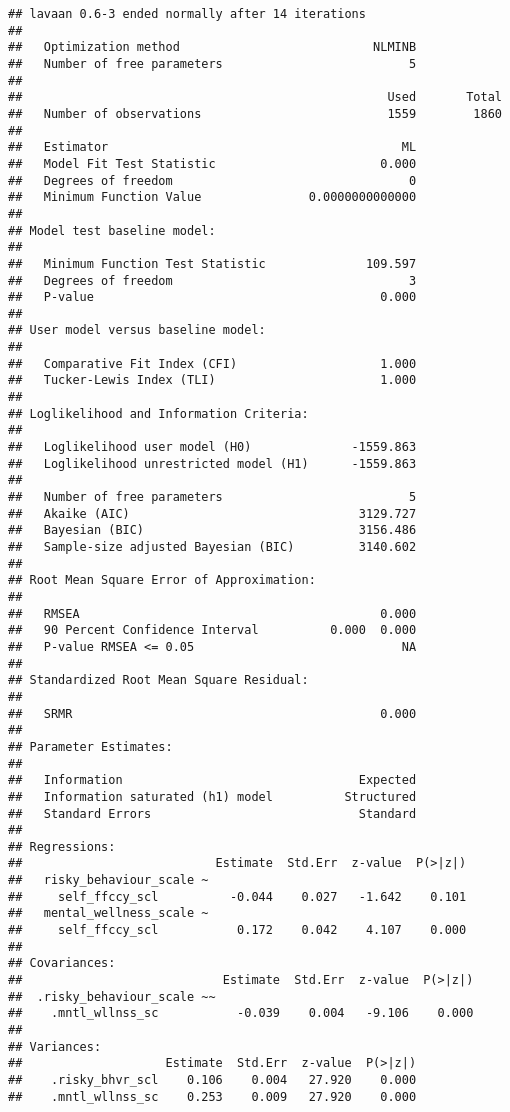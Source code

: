 \documentclass[9pt,]{article}
\begin{document}
\begin{verbatim}
## lavaan 0.6-3 ended normally after 14 iterations
## 
##   Optimization method                           NLMINB
##   Number of free parameters                          5
## 
##                                                   Used       Total
##   Number of observations                          1559        1860
## 
##   Estimator                                         ML
##   Model Fit Test Statistic                       0.000
##   Degrees of freedom                                 0
##   Minimum Function Value               0.0000000000000
## 
## Model test baseline model:
## 
##   Minimum Function Test Statistic              109.597
##   Degrees of freedom                                 3
##   P-value                                        0.000
## 
## User model versus baseline model:
## 
##   Comparative Fit Index (CFI)                    1.000
##   Tucker-Lewis Index (TLI)                       1.000
## 
## Loglikelihood and Information Criteria:
## 
##   Loglikelihood user model (H0)              -1559.863
##   Loglikelihood unrestricted model (H1)      -1559.863
## 
##   Number of free parameters                          5
##   Akaike (AIC)                                3129.727
##   Bayesian (BIC)                              3156.486
##   Sample-size adjusted Bayesian (BIC)         3140.602
## 
## Root Mean Square Error of Approximation:
## 
##   RMSEA                                          0.000
##   90 Percent Confidence Interval          0.000  0.000
##   P-value RMSEA <= 0.05                             NA
## 
## Standardized Root Mean Square Residual:
## 
##   SRMR                                           0.000
## 
## Parameter Estimates:
## 
##   Information                                 Expected
##   Information saturated (h1) model          Structured
##   Standard Errors                             Standard
## 
## Regressions:
##                           Estimate  Std.Err  z-value  P(>|z|)
##   risky_behaviour_scale ~                                    
##     self_ffccy_scl          -0.044    0.027   -1.642    0.101
##   mental_wellness_scale ~                                    
##     self_ffccy_scl           0.172    0.042    4.107    0.000
## 
## Covariances:
##                            Estimate  Std.Err  z-value  P(>|z|)
##  .risky_behaviour_scale ~~                                    
##    .mntl_wllnss_sc           -0.039    0.004   -9.106    0.000
## 
## Variances:
##                    Estimate  Std.Err  z-value  P(>|z|)
##    .risky_bhvr_scl    0.106    0.004   27.920    0.000
##    .mntl_wllnss_sc    0.253    0.009   27.920    0.000
\end{verbatim}
\end{document}
